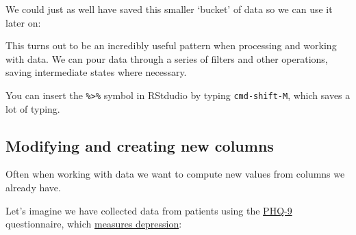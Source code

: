 \documentclass[]{article}
\newenvironment{Shaded}{\begin{snugshade}}{\end{snugshade}}
\newcommand{\KeywordTok}[1]{\textcolor[rgb]{0.13,0.29,0.53}{\textbf{#1}}}
\newcommand{\DecValTok}[1]{\textcolor[rgb]{0.00,0.00,0.81}{#1}}
\newcommand{\StringTok}[1]{\textcolor[rgb]{0.31,0.60,0.02}{#1}}
\newcommand{\OperatorTok}[1]{\textcolor[rgb]{0.81,0.36,0.00}{\textbf{#1}}}
\newcommand{\NormalTok}[1]{#1}
\theoremstyle{definition}
\theoremstyle{definition}
\theoremstyle{definition}
\theoremstyle{remark}
\begin{document}
We could just as well have saved this smaller `bucket' of data so we can
use it later on:

\begin{Shaded}
\end{Shaded}

This turns out to be an incredibly useful pattern when processing and
working with data. We can pour data through a series of filters and
other operations, saving intermediate states where necessary.

{You can insert the \texttt{\%\textgreater{}\%} symbol in RStdudio by
typing \texttt{cmd-shift-M}, which saves a lot of typing.}

\subsection*{Modifying and creating new columns}\label{mutate}

Often when working with data we want to compute new values from columns
we already have.

Let's imagine we have collected data from patients using the
\href{http://www.nhs.uk/Tools/Documents/Mood\%20self-assessment.htm}{PHQ-9}
questionnaire, which
\href{http://onlinelibrary.wiley.com/doi/10.1046/j.1525-1497.2001.016009606.x/abstract}{measures
depression}:
\end{document}
